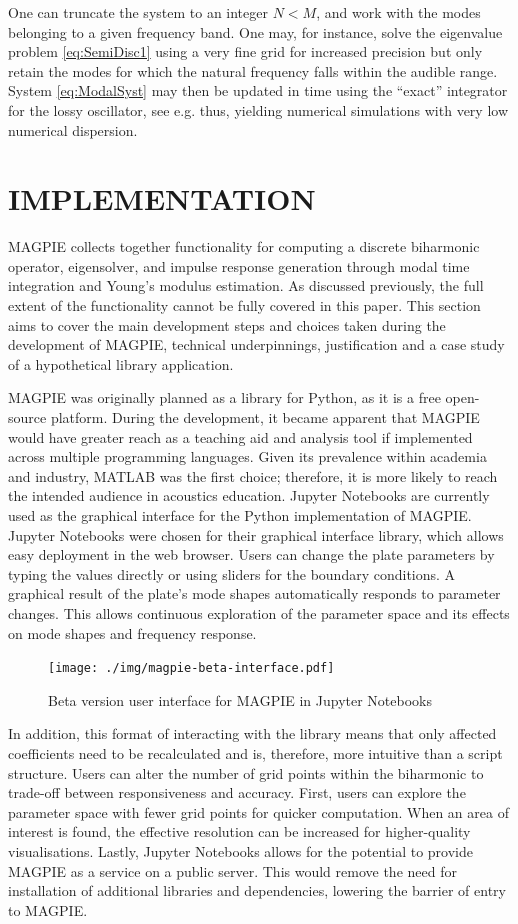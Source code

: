 One can truncate the system to an integer $N < M$, and work with the modes belonging to a given frequency band. One may, for instance, solve the eigenvalue problem \eqref{eq:SemiDisc1} using a very fine grid for increased precision but only retain the modes for which the natural frequency falls within the audible range. System \ref{eq:ModalSyst} may then be updated in time using the ``exact'' integrator for the lossy oscillator, see e.g. \cite{Cieśliński_JDEA_2011} thus, yielding numerical simulations with very low numerical dispersion.


\section{IMPLEMENTATION}\label{sec:implementation}

MAGPIE collects together functionality for computing a discrete biharmonic operator, eigensolver, and impulse response generation through modal time integration and Young's modulus estimation. As discussed previously, the full extent of the functionality cannot be fully covered in this paper. This section aims to cover the main development steps and choices taken during the development of MAGPIE, technical underpinnings, justification and a case study of a hypothetical library application.

\noindent
MAGPIE was originally planned as a library for Python, as it is a free open-source platform. During the development, it became apparent that MAGPIE would have greater reach as a teaching aid and analysis tool if implemented across multiple programming languages.  Given its prevalence within academia and industry, MATLAB was the first choice; therefore, it is more likely to reach the intended audience in acoustics education. Jupyter Notebooks are currently used as the graphical interface for the Python implementation of MAGPIE. Jupyter Notebooks were chosen for their graphical interface library, which allows easy deployment in the web browser. Users can change the plate parameters by typing the values directly or using sliders for the boundary conditions. A graphical result of the plate's mode shapes automatically responds to parameter changes. This allows continuous exploration of the parameter space and its effects on mode shapes and frequency response.
\begin{figure}[H]
    \centering
    \texttt{[image: ./img/magpie-beta-interface.pdf]}
    \caption{Beta version user interface for MAGPIE in Jupyter Notebooks}
    \label{fig:magpie-ui}
\end{figure}
In addition, this format of interacting with the library means that only affected coefficients need to be recalculated and is, therefore, more intuitive than a script structure. Users can alter the number of grid points within the biharmonic to trade-off between responsiveness and accuracy. First, users can explore the parameter space with fewer grid points for quicker computation. When an area of interest is found, the effective resolution can be increased for higher-quality visualisations. Lastly, Jupyter Notebooks allows for the potential to provide MAGPIE as a service on a public server. This would remove the need for installation of additional libraries and dependencies, lowering the barrier of entry to MAGPIE. 

